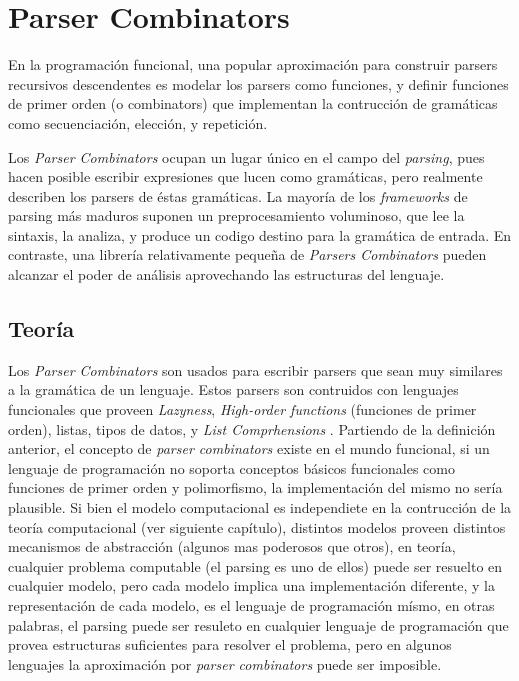 
\chapter{Parser Combinators}

En la programación funcional, una popular aproximación para construir parsers recursivos descendentes es modelar los parsers como funciones, y definir funciones de primer orden (o combinators) que implementan la contrucción de gramáticas como secuenciación, elección, y repetición.\cite{Hutton1996}

Los \emph{Parser Combinators} ocupan un lugar único en el campo del \emph{parsing}, pues hacen posible escribir expresiones que lucen como gramáticas, pero realmente describen los parsers de éstas gramáticas. La mayoría de los \emph{frameworks} de parsing más maduros suponen un preprocesamiento voluminoso, que lee la sintaxis, la analiza, y produce un codigo destino para la gramática de entrada. En contraste, una librería relativamente pequeña de \emph{Parsers Combinators} pueden alcanzar el poder de análisis aprovechando las estructuras del lenguaje.\cite{Swierstra2008}


\section{Teoría}

Los \emph{Parser Combinators} son usados para escribir parsers que sean muy similares a la gramática de un lenguaje. Estos parsers son contruidos con lenguajes funcionales que proveen \emph{Lazyness}, \emph{High-order functions} (funciones de primer orden), listas, tipos de datos, y \emph{List Comprhensions} \cite{Jeuring2010}. Partiendo de la definición anterior, el concepto de \emph{parser combinators} existe en el mundo funcional, si un lenguaje de programación no soporta conceptos básicos funcionales como funciones de primer orden y polimorfismo, la implementación del mismo no sería plausible. Si bien el modelo computacional es independiete en la contrucción de la teoría computacional (ver siguiente capítulo), distintos modelos proveen distintos mecanismos de abstracción (algunos mas poderosos que otros), en teoría, cualquier problema computable (el parsing es uno de ellos) puede ser resuelto en cualquier modelo, pero cada modelo implica una implementación diferente, y la representación de cada modelo, es el lenguaje de programación mísmo, en otras palabras, el parsing puede ser resuleto en cualquier lenguaje de programación que provea estructuras suficientes para resolver el problema, pero en algunos lenguajes la aproximación por \emph{parser combinators} puede ser imposible.

